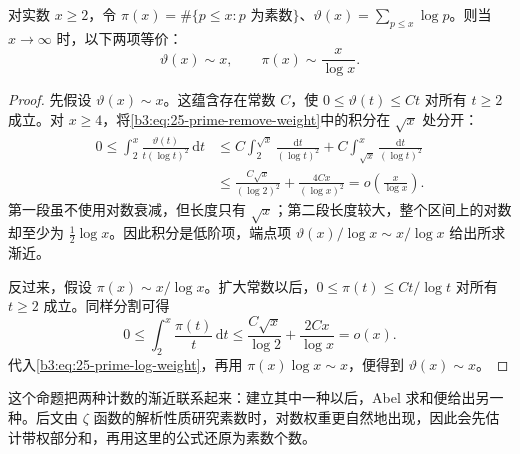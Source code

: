 \begin{proposition}[素数计数的两种渐近形式]\label{b3:prop:25-prime-counting-equivalence}
对实数 \(x\ge2\)，令 \(\pi(x)=\#\{p\le x:p\text{ 为素数}\}\)、\(\vartheta(x)=\sum_{p\le x}\log p\)。则当 \(x\to\infty\) 时，以下两项等价：
\[
 \vartheta(x)\sim x,\qquad \pi(x)\sim\frac{x}{\log x}.
\]
\end{proposition}
\begin{proof}
先假设 \(\vartheta(x)\sim x\)。这蕴含存在常数 \(C\)，使 \(0\le\vartheta(t)\le Ct\) 对所有 \(t\ge2\) 成立。对 \(x\ge4\)，将\eqref{b3:eq:25-prime-remove-weight}中的积分在 \(\sqrt x\) 处分开：
\begin{align*}
 0\le\int_2^x\frac{\vartheta(t)}{t(\log t)^2}\,\mathrm dt
 &\le C\int_2^{\sqrt x}\frac{\mathrm dt}{(\log t)^2}
       +C\int_{\sqrt x}^x\frac{\mathrm dt}{(\log t)^2}\\
 &\le\frac{C\sqrt x}{(\log2)^2}
       +\frac{4Cx}{(\log x)^2}
 =o\left(\frac x{\log x}\right).
\end{align*}
第一段虽不使用对数衰减，但长度只有 \(\sqrt x\)；第二段长度较大，整个区间上的对数却至少为 \(\frac12\log x\)。因此积分是低阶项，端点项 \(\vartheta(x)/\log x\sim x/\log x\) 给出所求渐近。

反过来，假设 \(\pi(x)\sim x/\log x\)。扩大常数以后，\(0\le\pi(t)\le Ct/\log t\) 对所有 \(t\ge2\) 成立。同样分割可得
\[
 0\le\int_2^x\frac{\pi(t)}t\,\mathrm dt
 \le\frac{C\sqrt x}{\log2}+\frac{2Cx}{\log x}=o(x).
\]
代入\eqref{b3:eq:25-prime-log-weight}，再用 \(\pi(x)\log x\sim x\)，便得到 \(\vartheta(x)\sim x\)。
\end{proof}

这个命题把两种计数的渐近联系起来：建立其中一种以后，Abel 求和便给出另一种。后文由 \(\zeta\) 函数的解析性质研究素数时，对数权重更自然地出现，因此会先估计带权部分和，再用这里的公式还原为素数个数。
